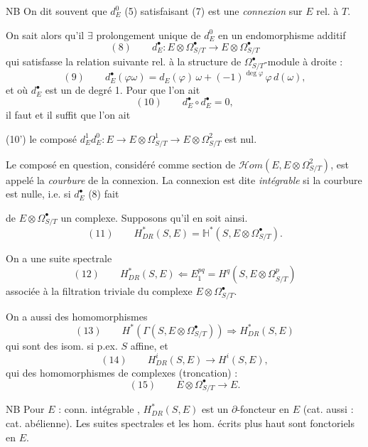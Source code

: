 \documentclass[11pt,a4paper]{article}
\begin{document}
NB On dit souvent que $d^0_E$ (5) satisfaisant (7) est une \emph{connexion} sur $E$ rel. à $T$.

On sait alors qu'il $\exists$ prolongement unique de $d^0_E$
 en un endomorphisme additif
\[
(8)\qquad d^\bullet_E : E \otimes \Omega^\bullet_{S/T} \longrightarrow E \otimes \Omega^\bullet_{S/T}
\]
qui \struck{\ill{}} satisfasse la relation suivante rel. à la structure de
$\Omega^\bullet_{S/T}$-module à droite :
\[
(9)\qquad d^\bullet_E(\varphi\omega) = d_E(\varphi)\,\omega + (-1)^{\deg\varphi}\,\varphi\, d(\omega) ,
\]
et où $d^\bullet_E$ est un  de degré 1. Pour que l'on ait
\[
(10)\qquad d^\bullet_E \circ d^\bullet_E = 0 ,
\]
il faut et il suffit que l'on ait

(10') le composé $d^1_E d^0_E : E \to E \otimes \Omega^1_{S/T} \to E \otimes \Omega^2_{S/T}$
est nul.

Le composé en question, considéré comme section de
$\mathcal{H}om(E, E \otimes \Omega^2_{S/T})$, est appelé la \emph{courbure} de la connexion.
La connexion est dite \emph{intégrable} si la courbure est nulle, i.e. si $d^\bullet_E$ (8)
fait

de $E \otimes \Omega^\bullet_{S/T}$ un complexe. Supposons qu'il en soit ainsi.
\struck{\ill{}}
\[
(11)\qquad H^*_{DR}(S,E) = \mathbb{H}^*(S, E \otimes \Omega^\bullet_{S/T}) .
\]

On a une suite spectrale
\[
(12)\qquad H^*_{DR}(S,E) \Longleftarrow E_1^{pq} = H^q(S, E \otimes \Omega^p_{S/T})
\]
associée à la filtration triviale du complexe $E \otimes \Omega^\bullet_{S/T}$.

On a aussi des homomorphismes \ill{}
\[
(13)\qquad H^*(\Gamma(S, E \otimes \Omega^\bullet_{S/T})) \Longrightarrow H^*_{DR}(S,E)
\]
qui sont des isom. si p.ex. $S$ affine, et
\[
(14)\qquad H^i_{DR}(S,E) \longrightarrow H^i(S,E) ,
\]
qui \ill{}  des homomorphismes de complexes  (troncation) :
\[
(15)\qquad E \otimes \Omega^\bullet_{S/T} \longrightarrow E .
\]

NB Pour $E$ \ill{} : conn. intégrable ,
$H^*_{DR}(S,E)$ est un $\partial$-foncteur en $E$ (cat. \ill{} aussi : cat. abélienne). Les
suites spectrales \ill{} et les hom. écrits plus haut sont fonctoriels en $E$.
\end{document}
